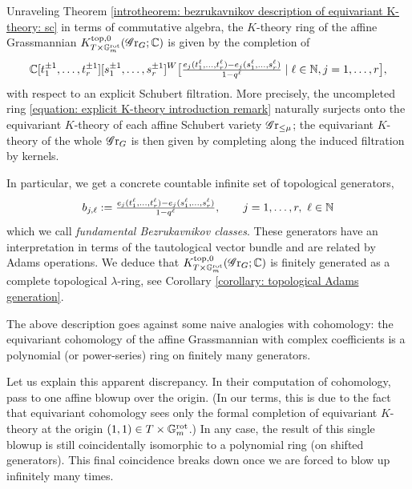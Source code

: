 \begin{remark}
Unraveling Theorem \ref{introtheorem: bezrukavnikov description of equivariant K-theory: sc} in terms of commutative algebra, the $K$-theory ring of the affine Grassmannian $K^{\mathrm{top}, 0}_{T \times \mathbb{G}_m^{\mathrm{rot}}}(\operatorname{\mathscr{G}r}_G; \operatorname{\mathbb{C}})$ is given by the completion of
\begin{equation}\label{equation: explicit K-theory introduction remark}
    \operatorname{\mathbb{C}}[t_1^{\pm 1}, \dots, t_r^{\pm 1}][s^{\pm 1}_1, \dots, s^{\pm 1}_r]^W \big[\tfrac{e_j(t_1^{\ell}, \dots, t_r^{\ell}) - e_j(s_1^{\ell}, \dots, s_r^{\ell})}{1-q^{\ell}} \mid \ell \in \operatorname{\mathbb{N}}, j = 1, \dots, r\big],
\end{equation}
with respect to an explicit Schubert filtration.
%
More precisely, the uncompleted ring \eqref{equation: explicit K-theory introduction remark} naturally surjects onto the equivariant $K$-theory of each affine Schubert variety $\operatorname{\mathscr{G}r}_{\leq \mu}$; the equivariant $K$-theory of the whole $\operatorname{\mathscr{G}r}_G$ is then given by completing along the induced filtration by kernels. 

In particular, we get a concrete countable infinite set of topological generators, 
\begin{equation*}
    b_{j, \ell} := \tfrac{e_j(t_1^{\ell}, \dots, t_r^{\ell}) - e_j(s_1^{\ell}, \dots, s_r^{\ell})}{1-q^{\ell}}, \qquad j =1, \dots, r, \ \ell \in \operatorname{\mathbb{N}}
\end{equation*}
which we call \textit{fundamental Bezrukavnikov classes}. 
These generators have an interpretation in terms of the tautological vector bundle and are related by Adams operations. We deduce that $K^{\mathrm{top}, 0}_{T \times \mathbb{G}_m^{\mathrm{rot}}}(\operatorname{\mathscr{G}r}_G; \operatorname{\mathbb{C}})$ is finitely generated as a complete topological $\lambda$-ring, see Corollary \ref{corollary: topological Adams generation}. 
\end{remark}

\begin{remark}
The above description goes against some naive analogies with cohomology: the equivariant cohomology of the affine Grassmannian with complex coefficients is a polynomial (or power-series) ring on finitely many generators.

Let us explain this apparent discrepancy. In their computation of cohomology, \cite{BF07} pass to one affine blowup over the origin. (In our terms, this is due to the fact that equivariant cohomology sees only the formal completion of equivariant $K$-theory at the origin $(1,1) \in T \times \mathbb{G}_m^{\mathrm{rot}}$.) In any case, the result of this single blowup is still coincidentally isomorphic to a polynomial ring (on shifted generators). This final coincidence breaks down once we are forced to blow up infinitely many times.
\end{remark}

